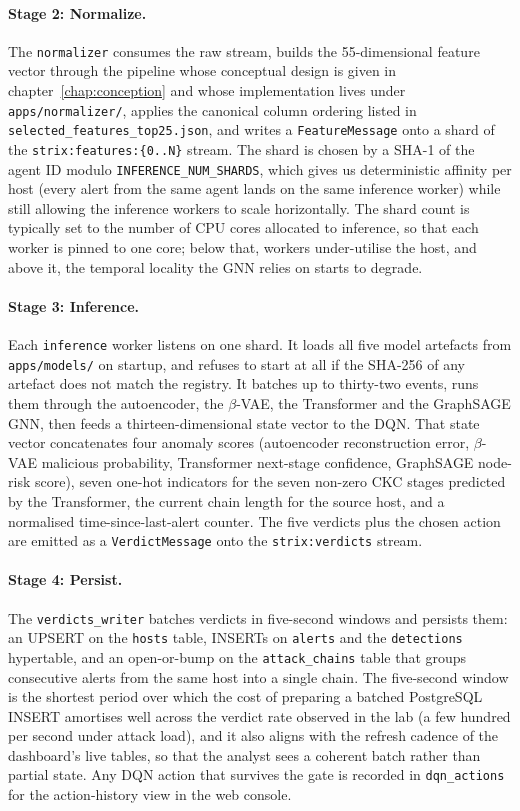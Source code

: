 \paragraph{Stage 2: Normalize.} The \texttt{normalizer} consumes
the raw stream, builds the 55-dimensional feature vector through the
pipeline whose conceptual design is given in
chapter~\ref{chap:conception} and whose implementation lives under
\texttt{apps/normalizer/}, applies the canonical column ordering
listed in \texttt{selected\_features\_top25.json}, and writes a
\texttt{FeatureMessage} onto a shard of the
\texttt{strix:features:\{0..N\}} stream. The shard is chosen by a
SHA-1 of the agent ID modulo \texttt{INFERENCE\_NUM\_SHARDS}, which
gives us deterministic affinity per host (every alert from the same
agent lands on the same inference worker) while still allowing the
inference workers to scale horizontally. The shard count is
typically set to the number of CPU cores allocated to inference, so
that each worker is pinned to one core; below that, workers
under-utilise the host, and above it, the temporal locality the GNN
relies on starts to degrade.

\paragraph{Stage 3: Inference.} Each \texttt{inference} worker
listens on one shard. It loads all five model artefacts from
\texttt{apps/models/} on startup, and refuses to start at all if the
SHA-256 of any artefact does not match the registry. It batches up
to thirty-two events, runs them through the autoencoder, the
$\beta$-VAE, the Transformer and the GraphSAGE GNN, then feeds a
thirteen-dimensional state vector to the DQN. That state vector
concatenates four anomaly scores (autoencoder reconstruction error,
$\beta$-VAE malicious probability, Transformer next-stage confidence,
GraphSAGE node-risk score), seven one-hot indicators for the seven
non-zero CKC stages predicted by the Transformer, the current chain
length for the source host, and a normalised time-since-last-alert
counter. The five verdicts plus the chosen action are emitted as a
\texttt{VerdictMessage} onto the \texttt{strix:verdicts} stream.

\paragraph{Stage 4: Persist.} The \texttt{verdicts\_writer} batches
verdicts in five-second windows and persists them: an UPSERT on the
\texttt{hosts} table, INSERTs on \texttt{alerts} and the
\texttt{detections} hypertable, and an open-or-bump on the
\texttt{attack\_chains} table that groups consecutive alerts from the
same host into a single chain. The five-second window is the
shortest period over which the cost of preparing a batched
PostgreSQL INSERT amortises well across the verdict rate observed in
the lab (a few hundred per second under attack load), and it also
aligns with the refresh cadence of the dashboard's live tables, so
that the analyst sees a coherent batch rather than partial state.
Any DQN action that survives the gate is recorded in
\texttt{dqn\_actions} for the action-history view in the web
console.

